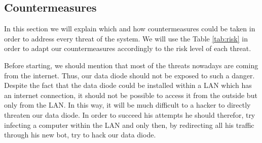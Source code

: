 \documentclass[a4paper,10pt]{article}
\begin{document}
\subsection{Countermeasures}
In this section we will explain which and how countermeasures could be taken in order to address every threat of the system. We will use the Table \ref{tab:risk} in order to adapt our countermeasures accordingly to the risk level of each threat.

Before starting, we should mention that most of the threats nowadays are coming from the internet. Thus, our data diode should not be exposed to such a danger. Despite the fact that the data diode could be installed within a LAN which has an internet connection, it should not be possible to access it from the outside but only from the LAN. In this way, it will be much difficult to a hacker to directly threaten our data diode. In order to succeed his attempts he should therefor, try infecting a computer within the LAN and only then, by redirecting all his traffic through his new bot, try to hack our data diode.
\end{document}
